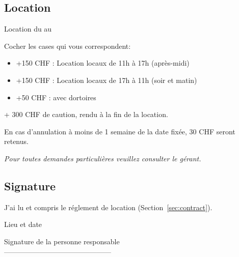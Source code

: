 \documentclass[a4paper,12pt]{extarticle}
\begin{document}
\subsection*{Location}

Location du  au 

Cocher les cases qui vous correspondent:

\begin{itemize}
    \item[]  +150 CHF : Location locaux de 11h à 17h (après-midi)
    \item[]  +150 CHF : Location locaux de 17h à 11h (soir et matin)
    \item[]  +50 CHF : avec dortoires
\end{itemize}

+ 300 CHF de caution, rendu à la fin de la location.

En cas d'annulation à moins de 1 semaine de la date fixée, 30 CHF seront retenus.

\textit{Pour toutes demandes particulières veuillez consulter le gérant.}

\subsection*{Signature}

 J'ai lu et compris le réglement de location (Section~\ref{sec:contract}).


Lieu et date  

Signature de la personne responsable\\[1.5cm]
---------------------------------------------
\end{document}
